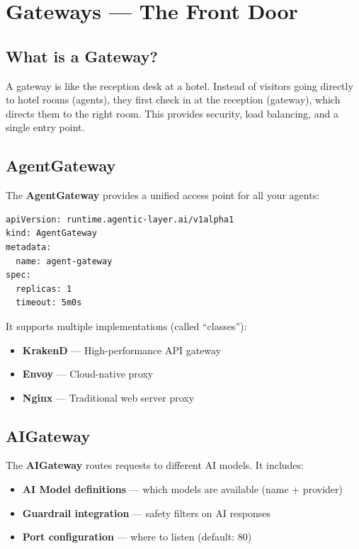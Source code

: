 \documentclass[12pt,a4paper,openany]{report}
\begin{document}
\chapter{Gateways — The Front Door}

\section{What is a Gateway?}

\begin{analogybox}
A gateway is like the reception desk at a hotel. Instead of visitors going directly to hotel rooms (agents), they first check in at the reception (gateway), which directs them to the right room. This provides security, load balancing, and a single entry point.
\end{analogybox}

\section{AgentGateway}

The \textbf{AgentGateway} provides a unified access point for all your agents:

\begin{lstlisting}[style=yaml, caption={An AgentGateway}]
apiVersion: runtime.agentic-layer.ai/v1alpha1
kind: AgentGateway
metadata:
  name: agent-gateway
spec:
  replicas: 1
  timeout: 5m0s
\end{lstlisting}

It supports multiple implementations (called ``classes''):
\begin{itemize}
    \item \textbf{KrakenD} — High-performance API gateway
    \item \textbf{Envoy} — Cloud-native proxy
    \item \textbf{Nginx} — Traditional web server proxy
\end{itemize}

\section{AIGateway}

The \textbf{AIGateway} routes requests to different AI models. It includes:
\begin{itemize}
    \item \textbf{AI Model definitions} — which models are available (name + provider)
    \item \textbf{Guardrail integration} — safety filters on AI responses
    \item \textbf{Port configuration} — where to listen (default: 80)
\end{itemize}
\end{document}
